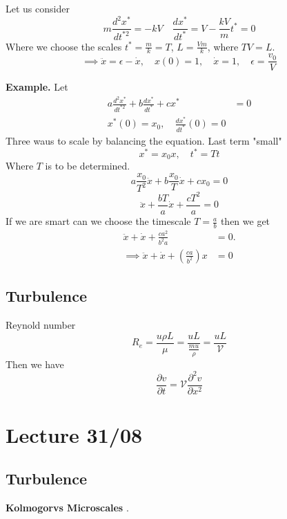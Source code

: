 \documentclass{article}
\theoremstyle{remark}
\begin{document}
Let us consider \[
  m \frac{d^2 x^{*}}{d t^{*2}}  = -kV \quad \frac{d x^{*}}{d t^{*}}  = V - \frac{kV}{m} t^{*} = 0
\] 
Where we choose the scales $t^{*} = \frac{m}{k}  = T$, $L = \frac{V m}{k} $, where  $TV = L$. \[
\implies \ddot{x} = \epsilon  - \dot{x}, \quad x\left( 0 \right) = 1, \quad \dot{x}   = 1, \quad    \epsilon  = \frac{v_{0}}{V} 
\] 
 \begin{tcolorbox}
   \textbf{Example.}  Let \[
   \begin{split}
     a \frac{d ^2 x^{*}}{d t^{*2}} + b \frac{d x^{*}}{d t^{*} }  + c x^{*} &=  0\\
     x^{*} \left( 0 \right) = x_{0} , \quad  \frac{d x^{*}}{d t^{*}} \left( 0 \right) = 0 
   \end{split} 
   \] 
   Three waus to scale by balancing the equation. Last term "small" \[
   x^{*} = x_{0} x, \quad  t^{*} = Tt 
   \] 
   Where $T$ is to be determined. \[
   a \frac{x_{0}}{T^2}  \ddot{x} + b \frac{x_{0}}{T}  \dot{x} + c x_{0}  = 0
   \] 
   \[
   \ddot{x} + \frac{bT}{a}  \dot{x} + \frac{cT^2}{a}  = 0
   \] 
   If we are smart can we choose the timescale $T = \frac{a}{b}$  then we get \[
     \begin{split}
   \ddot{x} + \dot{x} + \frac{c a^2}{b^2 a}  &=   0.  \\
   \implies  \ddot{x} + \dot{x} + \left( \frac{ca}{b^2}  \right)x &=   0
     \end{split} 
   \] 
 \end{tcolorbox}

\subsection{Turbulence}%
\label{sub:turbulence}

Reynold number \[
  R_{e} = \frac{u \rho L}{\mu }  = \frac{uL}{\frac{mu}{\rho } }  =  \frac{uL}{\mathcal{V}   }  
\] 
Then we have \[
\frac{\partial v}{\partial t}  = \mathcal{V}  \frac{\partial ^2 v}{\partial x^2} 
\] 


\newpage
\section{Lecture 31/08}%
\label{sec:lecture_31_08}

\subsection{Turbulence }%
\label{sub:turbulence_}
\textbf{Kolmogorvs Microscales} .
\end{document}
